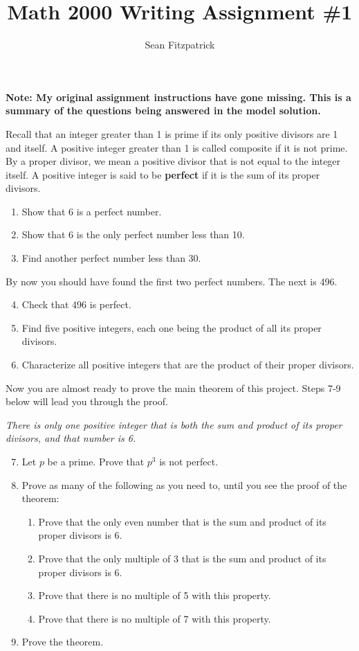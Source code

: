 \documentclass[letterpaper,12pt]{article}
\title{Math 2000 Writing Assignment \#1}
\author{Sean Fitzpatrick}
\theoremstyle{definition}
\begin{document}
 \maketitle

{\bf Note: My original assignment instructions have gone missing. This is a summary of the questions being answered in the model solution.}

Recall that an integer greater than 1 is prime if its only positive divisors are 1 and itself. A positive integer greater than 1 is called composite if it is not prime. By a proper divisor, we mean a positive divisor that is not equal to the integer itself. A positive integer is said to be {\bf perfect} if it is the sum of its proper divisors.

\begin{enumerate}
 \item Show that 6 is a perfect number.
 \item Show that 6 is the only perfect number less than 10.
 \item Find another perfect number less than 30.
\end{enumerate}
By now you should have found the first two perfect numbers. The next is 496.

\begin{enumerate}\setcounter{enumi}{3}
 \item Check that 496 is perfect.
 \item Find five positive integers, each one being the product of all its proper divisors.
 \item Characterize all positive integers that are the product of their proper divisors.
\end{enumerate}
Now you are almost ready to prove the main theorem of this project. Steps 7-9 below will lead you through the proof.

 {\em There is only one positive integer that is both the sum and product of its proper divisors, and that number is 6.}


\begin{enumerate}\setcounter{enumi}{6}
 \item Let $p$ be a prime. Prove that $p^3$ is not perfect.
 \item Prove as many of the following as you need to, until you see the proof of the theorem:
\begin{enumerate}
 \item Prove that the only even number that is the sum and product of its proper divisors is 6.
 \item Prove that the only multiple of 3 that is the sum and product of its proper divisors is 6.
 \item Prove that there is no multiple of 5 with this property.
 \item Prove that there is no multiple of 7 with this property.
\end{enumerate}
 \item Prove the theorem.

\end{enumerate}
\end{document}
